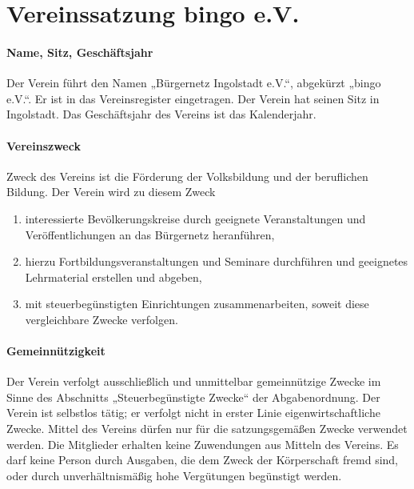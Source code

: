 \section{Vereinssatzung bingo e.V.}

\begin{multicols}{2}

\paragraph{Name, Sitz, Geschäftsjahr}
Der Verein führt den Namen „Bürgernetz Ingolstadt e.V.“, abgekürzt „bingo
e.V.“. Er ist in das Vereinsregister eingetragen. Der Verein hat seinen Sitz in
Ingolstadt. Das Geschäftsjahr des Vereins ist das Kalenderjahr.

\paragraph{Vereinszweck}
Zweck des Vereins ist die Förderung der Volksbildung und der beruflichen
Bildung. Der Verein wird zu diesem Zweck 
\renewcommand{\labelenumi}{\alph{enumi}}
\begin{enumerate}
\setlength{\itemsep}{-2pt}
\item interessierte Bevölkerungskreise durch geeignete Veranstaltungen und Veröffentlichungen an das Bürgernetz
heranführen, 
\item hierzu Fortbildungsveranstaltungen und Seminare
durchführen und geeignetes Lehrmaterial erstellen und abgeben, 
\item mit steuerbegünstigten Einrichtungen zusammenarbeiten, soweit diese
vergleichbare Zwecke verfolgen.
\end{enumerate}

\paragraph{Gemeinnützigkeit}
Der Verein verfolgt ausschließlich und unmittelbar gemeinnützige Zwecke
im Sinne des Abschnitts „Steuerbegünstigte Zwecke“ der Abgabenordnung.
Der Verein ist selbstlos tätig; er verfolgt nicht in erster Linie
eigenwirtschaftliche Zwecke. Mittel des Vereins dürfen nur für die
satzungsgemäßen Zwecke verwendet werden. Die Mitglieder erhalten keine
Zuwendungen aus Mitteln des Vereins. Es darf keine Person durch
Ausgaben, die dem Zweck der Körperschaft fremd sind, oder durch
unverhältnismäßig hohe Vergütungen begünstigt werden.


\end{multicols}
